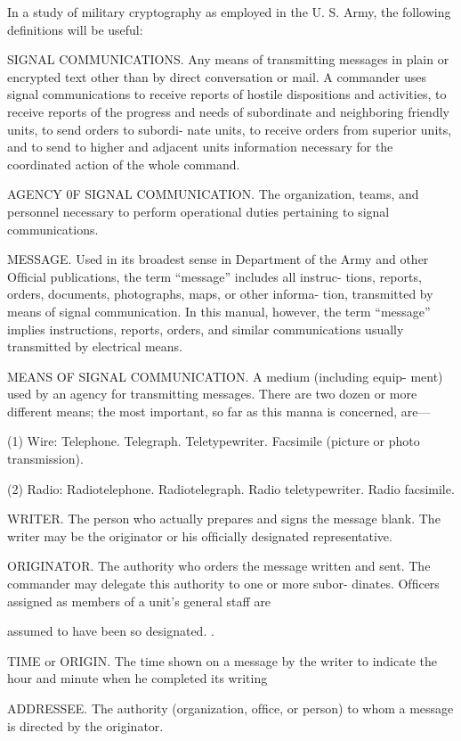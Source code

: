 In a study of military cryptography as employed in the U. S. Army,
the following deﬁnitions will be useful:

\mypara SIGNAL COMMUNICATIONS. Any means of transmitting messages
in plain or encrypted text other than by direct conversation or mail. A
commander uses signal communications to receive reports of hostile
dispositions and activities, to receive reports of the progress and needs
of subordinate and neighboring friendly units, to send orders to subordi-
nate units, to receive orders from superior units, and to send to higher
and adjacent units information necessary for the coordinated action of
the whole command.

\mypara AGENCY 0F SIGNAL COMMUNICATION. The organization, teams, and
personnel necessary to perform operational duties pertaining to signal
communications.

\mypara MESSAGE. Used in its broadest sense in Department of the Army
and other Ofﬁcial publications, the term “message” includes all instruc-
tions, reports, orders, documents, photographs, maps, or other informa-
tion, transmitted by means of signal communication. In this manual,
however, the term “message” implies instructions, reports, orders, and
similar communications usually transmitted by electrical means.

\mypara MEANS OF SIGNAL COMMUNICATION. A medium (including equip-
ment) used by an agency for transmitting messages. There are two
dozen or more different means; the most important, so far as this manna
is concerned, are—

(1) Wire:
Telephone.
Telegraph.
Teletypewriter.
Facsimile (picture or photo transmission).

(2) Radio:
Radiotelephone.
Radiotelegraph.
Radio teletypewriter.
Radio facsimile.

\mypara WRITER. The person who actually prepares and signs the message
blank. The writer may be the originator or his ofﬁcially designated
representative.

\mypara ORIGINATOR. The authority who orders the message written and
sent. The commander may delegate this authority to one or more subor-
dinates. Ofﬁcers assigned as members of a unit’s general staff are

assumed to have been so designated. .

\mypara TIME or ORIGIN. The time shown on a message by the writer to
indicate the hour and minute when he completed its writing

\mypara ADDRESSEE. The authority (organization, ofﬁce, or person) to whom
a message is directed by the originator.

